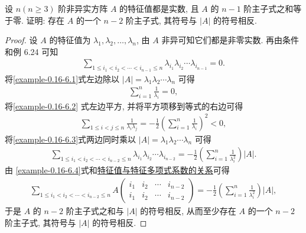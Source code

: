 \documentclass[../../main.tex]{subfiles}
\begin{document}
\begin{example}
设 $n (n \geqslant  3)$ 阶非异实方阵 $A$ 的特征值都是实数, 且 $A$ 的 $n-1$ 阶主子式之和等于零. 证明: 存在 $A$ 的一个 $n-2$ 阶主子式, 其符号与 $|A|$ 的符号相反.
\end{example}
\begin{proof}
设 $A$ 的特征值为 $\lambda_1, \lambda_2, \dots, \lambda_n$, 由 $A$ 非异可知它们都是非零实数. 再由条件和例 6.24 可知
\begin{align}
\sum_{1 \leqslant  i_1 < i_2 < \cdots < i_{n-1} \leqslant  n} \lambda_{i_1} \lambda_{i_2} \cdots \lambda_{i_{n-1}} = 0.\label{example-0.16-6.1}
\end{align}
将\eqref{example-0.16-6.1}式左边除以 $|A| = \lambda_1 \lambda_2 \cdots \lambda_n$ 可得
\begin{align}
\sum_{i=1}^n \frac{1}{\lambda_i} = 0, \label{example-0.16-6.2}
\end{align}
将\eqref{example-0.16-6.2} 式左边平方, 并将平方项移到等式的右边可得
\begin{align}
\sum_{1 \leqslant  i < j \leqslant  n} \frac{1}{\lambda_i \lambda_j} = -\frac{1}{2} \left( \sum_{i=1}^n \frac{1}{\lambda_i} \right)^2 < 0, \label{example-0.16-6.3}
\end{align}
将\eqref{example-0.16-6.3}式两边同时乘以 $|A| = \lambda_1 \lambda_2 \cdots \lambda_n$ 可得
\begin{align}
\sum_{1 \leqslant  i_1 < i_2 < \cdots < i_{n-2} \leqslant  n} \lambda_{i_1} \lambda_{i_2} \cdots \lambda_{i_{n-2}} = -\frac{1}{2} \left( \sum_{i=1}^n \frac{1}{\lambda_i^2} \right) |A|. \label{example-0.16-6.4}
\end{align}
由 \eqref{example-0.16-6.4}式和\hyperref[proposition:特征值与特征多项式系数的关系]{特征值与特征多项式系数的关系}可得
\begin{align*}
\sum_{1 \leqslant  i_1 < i_2 < \cdots < i_{n-2} \leqslant  n} A \begin{pmatrix}
i_1 & i_2 & \cdots & i_{n-2} \\
i_1 & i_2 & \cdots & i_{n-2}
\end{pmatrix} = -\frac{1}{2} \left( \sum_{i=1}^n \frac{1}{\lambda_i^2} \right) |A|,
\end{align*}
于是 $A$ 的 $n-2$ 阶主子式之和与 $|A|$ 的符号相反, 从而至少存在 $A$ 的一个 $n-2$ 阶主子式, 其符号与 $|A|$ 的符号相反. 
\end{proof}
\end{document}
